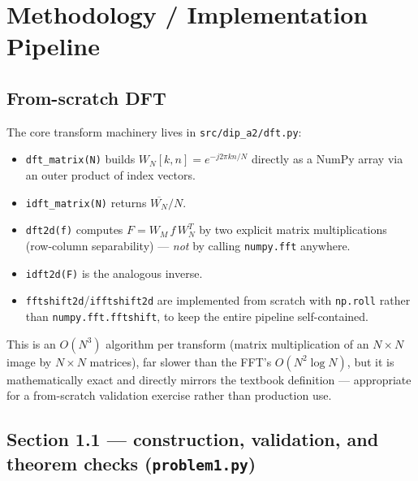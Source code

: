 \documentclass[11pt]{article}
\begin{document}
\section{Methodology / Implementation Pipeline}

\subsection{From-scratch DFT}

The core transform machinery lives in \texttt{src/dip\_a2/dft.py}:
\begin{itemize}
  \item \texttt{dft\_matrix(N)} builds $W_N[k,n]=e^{-j2\pi kn/N}$ directly as a NumPy array via
    an outer product of index vectors.
  \item \texttt{idft\_matrix(N)} returns $\overline{W_N}/N$.
  \item \texttt{dft2d(f)} computes $F = W_M\,f\,W_N^T$ by two explicit matrix multiplications
    (row-column separability) — \emph{not} by calling \texttt{numpy.fft} anywhere.
  \item \texttt{idft2d(F)} is the analogous inverse.
  \item \texttt{fftshift2d}/\texttt{ifftshift2d} are implemented from scratch with \texttt{np.roll}
    rather than \texttt{numpy.fft.fftshift}, to keep the entire pipeline self-contained.
\end{itemize}
This is an $O(N^3)$ algorithm per transform (matrix multiplication of an $N\times N$ image by
$N\times N$ matrices), far slower than the FFT's $O(N^2\log N)$, but it is mathematically exact
and directly mirrors the textbook definition — appropriate for a from-scratch validation
exercise rather than production use.

\subsection{Section 1.1 — construction, validation, and theorem checks (\texttt{problem1.py})}
\end{document}
